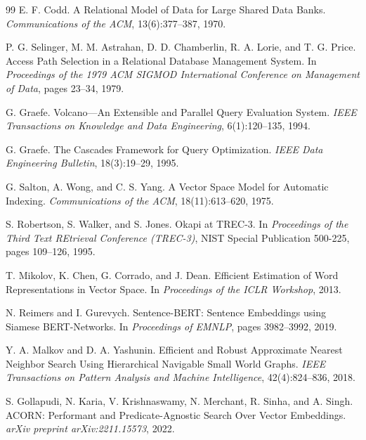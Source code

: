 \documentclass[sigconf,nonacm,review]{acmart}
\theoremstyle{plain}
\theoremstyle{definition}
\theoremstyle{remark}
\begin{document}
\begin{thebibliography}{99}
 E. F. Codd.
  A Relational Model of Data for Large Shared Data Banks.
  \emph{Communications of the ACM}, 13(6):377--387, 1970.

 P. G. Selinger, M. M. Astrahan, D. D. Chamberlin,
  R. A. Lorie, and T. G. Price.
  Access Path Selection in a Relational Database Management System.
  In \emph{Proceedings of the 1979 ACM SIGMOD International Conference
  on Management of Data}, pages 23--34, 1979.

 G. Graefe.
  Volcano---An Extensible and Parallel Query Evaluation System.
  \emph{IEEE Transactions on Knowledge and Data Engineering},
  6(1):120--135, 1994.

 G. Graefe.
  The Cascades Framework for Query Optimization.
  \emph{IEEE Data Engineering Bulletin}, 18(3):19--29, 1995.

 G. Salton, A. Wong, and C. S. Yang.
  A Vector Space Model for Automatic Indexing.
  \emph{Communications of the ACM}, 18(11):613--620, 1975.

 S. Robertson, S. Walker, and S. Jones.
  Okapi at TREC-3.
  In \emph{Proceedings of the Third Text REtrieval Conference
  (TREC-3)}, NIST Special Publication 500-225, pages 109--126, 1995.

 T. Mikolov, K. Chen, G. Corrado, and J. Dean.
  Efficient Estimation of Word Representations in Vector Space.
  In \emph{Proceedings of the ICLR Workshop}, 2013.

 N. Reimers and I. Gurevych.
  Sentence-BERT: Sentence Embeddings using Siamese BERT-Networks.
  In \emph{Proceedings of EMNLP}, pages 3982--3992, 2019.

 Y. A. Malkov and D. A. Yashunin.
  Efficient and Robust Approximate Nearest Neighbor Search Using
  Hierarchical Navigable Small World Graphs.
  \emph{IEEE Transactions on Pattern Analysis and Machine
  Intelligence}, 42(4):824--836, 2018.

 S. Gollapudi, N. Karia, V. Krishnaswamy,
  N. Merchant, R. Sinha, and A. Singh.
  ACORN: Performant and Predicate-Agnostic Search Over
  Vector Embeddings.
  \emph{arXiv preprint arXiv:2211.15573}, 2022.


\end{thebibliography}
\end{document}
